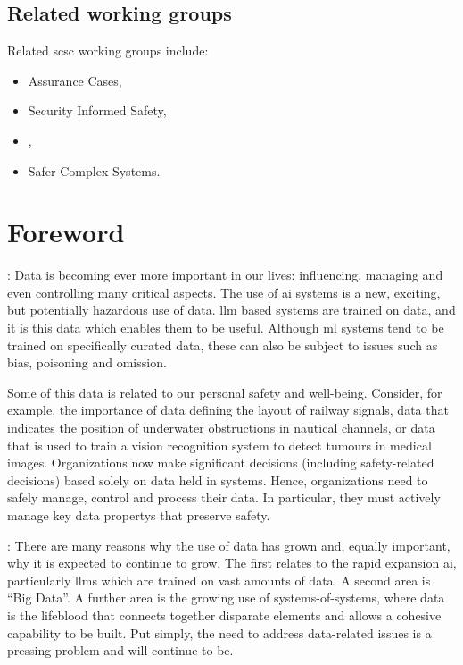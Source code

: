 %
%
%
\subsection*{Related working groups}
Related \gls{scsc} working groups include:
%
\begin{itemize}
	\item Assurance Cases,
	\item Security Informed Safety,
	\item {},
	\item Safer Complex Systems. 
\end{itemize}
%
%
\clearpage
%

\makeatletter		%
\dsiwg@intblankpage
\makeatother

\pagestyle{FirstPageFrontMatter}
\section*{Foreword}


:
Data is becoming ever more important in our lives: influencing, managing and even controlling many critical aspects.
The use of \gls{ai} systems is a new, exciting, but potentially hazardous use of data. \Gls{llm} based systems are trained on data, and it is this data which enables them to be useful. Although \gls{ml} systems tend to be trained on specifically curated data, these can also be subject to issues such as bias, poisoning and omission.

Some of this data is related to our personal safety and well-being.
Consider, for example, the importance of data defining the layout of railway signals,
data that indicates the position of underwater obstructions in nautical channels, or data that
is used to train a vision recognition system to detect tumours in medical images.
Organizations now make significant decisions (including safety-related decisions) based solely on data held in systems.
Hence, organizations need to safely manage, control and process their data.
In particular, they must actively manage key \glspl{data property} that preserve safety.

: There are many reasons why the use of data has grown and, equally important, why it is expected to continue to grow. The  first relates to the rapid expansion \gls{ai}, particularly \glspl{llm} which are trained on vast amounts of data. A second area is ``Big Data''. A further area is the growing use of systems-of-systems, where data is the lifeblood that connects together disparate elements and allows a cohesive capability to be built. Put simply, the need to address data-related issues is a pressing problem and will continue to be.

